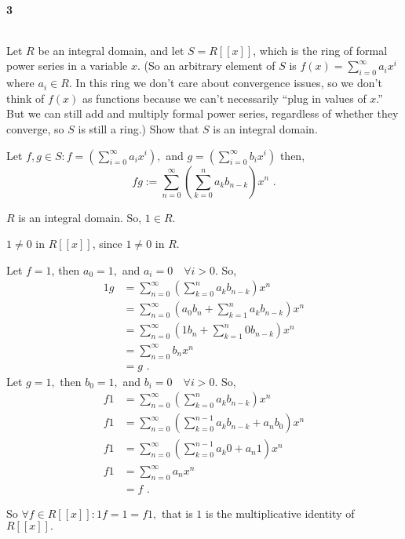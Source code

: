 \documentclass{article}
\begin{document}
\paragraph{3} $\text{ }$

Let $R$ be an integral domain, and let $S = R[[x]]$, which
is the ring of formal power series in a variable $x$. (So an arbitrary
element of $S$ is $f (x) = \sum_{i=0}^\infty a_i x^i$ where $a_i\in R$. In this
ring we don’t care about convergence issues, so we don’t think of $f (x)$ as functions because we can’t
necessarily “plug in values of $x$.” But we can still add and multiply formal power series, regardless
of whether they converge, so $S$ is still a ring.) Show that $S$ is an
integral domain.



Let $f,g \in S: f = \left(\sum_{i= 0}^{\infty} a_i x^i\right),$ and $g
= \left(  \sum_{i=
      0}^{\infty} b_i x^i\right)$ then,
\[fg :=  \sum_{n= 0}^{\infty} \left(
    \sum_{k=0}^n a_kb_{n-k}\right) x^n\text{ .}\]

$R$ is an integral domain. So, $1\in R$.

$1\neq 0$ in $R[[x]]$, since $1\neq 0$ in $R$.

Let $f = 1$, then $a_0 = 1,$ and $a_i = 0\quad \forall i>0$. So,
\begin{align*}
1g &=  \sum_{n= 0}^{\infty} \left(
     \sum_{k=0}^n a_kb_{n-k}\right) x^n\\
  &=  \sum_{n= 0}^{\infty} \left(
    a_0b_n + \sum_{k=1}^n a_kb_{n-k}\right) x^n\\
  &=  \sum_{n= 0}^{\infty} \left(
    1b_n + \sum_{k=1}^n 0b_{n-k}\right) x^n\\
   &=  \sum_{n= 0}^{\infty} b_n x^n\\
  &=  g\text{ .}
\end{align*}
Let $g = 1,$ then $b_0 = 1,$ and $b_i = 0\quad \forall i>0$. So,
\begin{align*}
  f1 &=  \sum_{n= 0}^{\infty} \left(
       \sum_{k=0}^n a_kb_{n-k}\right) x^n\\
  f1 &=  \sum_{n= 0}^{\infty} \left(
       \sum_{k=0}^{n-1} a_kb_{n-k} + a_nb_0\right) x^n\\
  f1 &=  \sum_{n= 0}^{\infty} \left(
    \sum_{k=0}^{n-1} a_k0 + a_n1\right) x^n\\
  f1
     &=  \sum_{n= 0}^{\infty} a_n x^n\\
  &=  f\text{ .}
\end{align*}

So $\forall f\in R[[x]]: 1f=1=f1,$ that is $1$ is the multiplicative identity of $R[[x]].$
\end{document}
